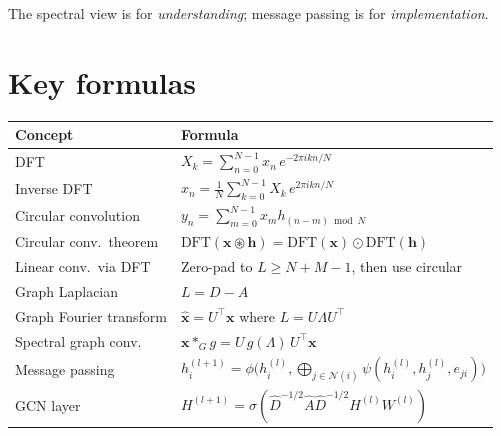 \begin{notechapter}
\begin{remark}
The spectral view is for \emph{understanding}; message passing is for
\emph{implementation}.
\end{remark}

\section{Key formulas}

\begin{center}
\renewcommand{\arraystretch}{1.6}
\begin{tabular}{ll}
\toprule
Concept & Formula \\
\midrule
DFT & $X_k = \sum_{n=0}^{N-1} x_n \, e^{-2\pi i kn/N}$ \\[0.3em]
Inverse DFT & $x_n = \frac{1}{N} \sum_{k=0}^{N-1} X_k \,
              e^{2\pi i kn/N}$ \\[0.3em]
Circular convolution & $y_n = \sum_{m=0}^{N-1} x_m h_{(n-m) \bmod N}$ \\[0.3em]
Circular conv.\ theorem & $\text{DFT}(\mathbf{x} \circledast \mathbf{h})
                         = \text{DFT}(\mathbf{x}) \odot
                           \text{DFT}(\mathbf{h})$ \\[0.3em]
Linear conv.\ via DFT & Zero-pad to $L \geq N+M-1$, then use circular \\[0.3em]
Graph Laplacian & $L = D - A$ \\[0.3em]
Graph Fourier transform & $\hat{\mathbf{x}} = U^\top \mathbf{x}$ where
                          $L = U\Lambda U^\top$ \\[0.3em]
Spectral graph conv.\ & $\mathbf{x} *_G g
                        = U \, g(\Lambda) \, U^\top \mathbf{x}$ \\[0.3em]
Message passing & $h_i^{(l+1)} = \phi\bigl( h_i^{(l)},
                  \bigoplus_{j \in \mathcal{N}(i)}
                  \psi(h_i^{(l)}, h_j^{(l)}, e_{ji}) \bigr)$ \\[0.3em]
GCN layer & $H^{(l+1)} = \sigma(\hat{D}^{-1/2}\hat{A}
            \hat{D}^{-1/2} H^{(l)} W^{(l)})$ \\
\bottomrule
\end{tabular}
\end{center}



\end{notechapter}
